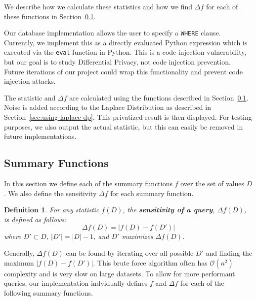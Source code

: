 \documentclass[conference,11pt]{IEEEtran}
\newtheorem{definition}{Definition}
\begin{document}
We describe how we calculate these statistics and how we find $\Delta f$ for
each of these functions in Section~\ref{sec:summary-functions}.

Our database implementation allows the user to specify a \texttt{WHERE} clause.
Currently, we implement this as a directly evaluated Python expression which is
executed via the \texttt{eval} function in Python. This is a code injection
vulnerability, but our goal is to study Differential Privacy, not code injection
prevention. Future iterations of our project could wrap this functionality and
prevent code injection attacks.


The statistic and $\Delta f$ are calculated using the functions described in
Section~\ref{sec:summary-functions}. Noise is added according to the Laplace
Distribution as described in Section~\ref{sec:using-laplace-dp}. This privatized
result is then displayed. For testing purposes, we also output the actual
statistic, but this can easily be removed in future implementations.

\subsection{Summary Functions}\label{sec:summary-functions}
In this section we define each of the summary functions $f$ over the set of
values $D$. We also define the sensitivity $\Delta f$ for each summary function.
\begin{mdframed}
    \begin{definition}
        For any statistic $f(D)$, the \textbf{sensitivity of a query}, $\Delta
        f(D)$, is defined as follows:
        \begin{equation}
            \Delta f(D) = \left|f(D) - f(D')\right|
        \end{equation}
        where $D' \subset D$, $|D'| = |D| - 1$, and $D'$ maximizes $\Delta
        f(D)$.
    \end{definition}
\end{mdframed}

Generally, $\Delta f(D)$ can be found by iterating over all possible $D'$ and
finding the maximum $|f(D) - f(D')|$. This brute force algorithm often has $\mathcal{O}(n^2)$
complexity and is very slow on large datasets. To allow for more performant
queries, our implementation indvidually defines $f$ and $\Delta f$ for each of
the following summary functions.
\end{document}
